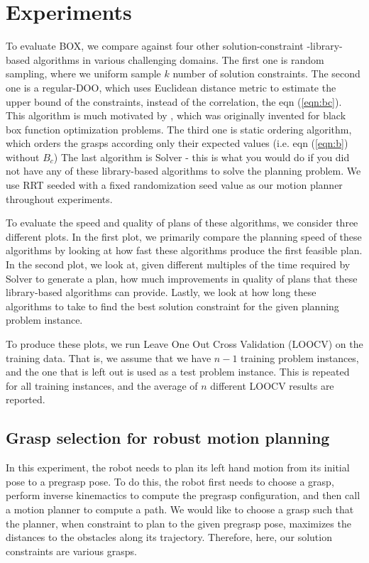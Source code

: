 \section{Experiments}
To evaluate BOX, we compare against four other solution-constraint 
-library-based algorithms in various
challenging domains. The first one is random sampling, 
where we uniform sample 
$k$ number of solution constraints. The second one is a 
regular-DOO, which uses Euclidean distance metric to estimate the upper bound
of the constraints, instead of the correlation, the  eqn (\ref{eqn:bc}). This algorithm is 
much motivated by \cite{MunosNIPS11}, which was originally invented for
black box function optimization problems. The third one is static ordering algorithm,
 which orders the grasps according only their
expected values (i.e. eqn (\ref{eqn:b}) without $B_c$)
The last algorithm is Solver - this is what you would do 
if you did not have any of these library-based algorithms to solve the planning problem.
We use RRT seeded with a fixed randomization seed value as our motion 
planner throughout experiments.

To evaluate the speed and quality of plans of these algorithms,
we consider three different plots. 
In the first plot, we primarily compare 
the planning speed of these algorithms by looking at how fast
these algorithms produce the first feasible plan.
In the second plot, we look at, given different
multiples of the time required by Solver to generate
a plan, how much improvements in quality of plans that these
library-based algorithms can provide. Lastly, we look at 
how long these algorithms to take to find the best solution
constraint for the given planning problem instance.

To produce these plots, we run Leave One Out Cross Validation (LOOCV) on the
training data. That is, we assume that we have $n-1$ training problem instances,
and the one that is left out is used as a test problem instance. This is
repeated for all training instances, and the average of $n$ different LOOCV
results are reported.

\subsection{Grasp selection for robust motion planning}
In this experiment, the robot needs to plan its left hand motion 
from its initial pose to a pregrasp pose. 
To do this, the robot first needs to
choose a grasp, perform inverse kinemactics to compute the
pregrasp configuration, and then call a motion planner to
compute a path. We would like to choose a grasp such that
the planner, when constraint to plan to the given
pregrasp pose, maximizes the distances to the obstacles
along its trajectory. Therefore, here, our solution constraints
are various grasps. 

